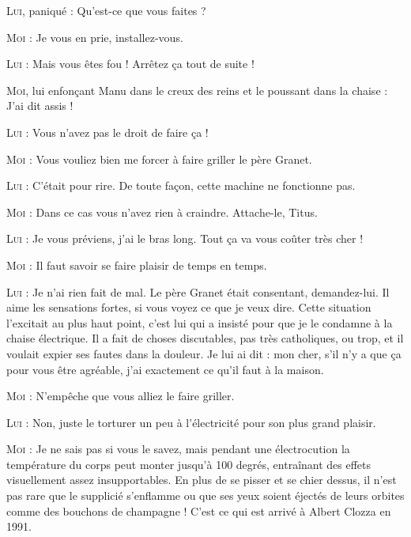 \begin{dialogue}

\textsc{Lui}, paniqué : Qu’est-ce que vous faites ?

\textsc{Moi} : Je vous en prie, installez-vous.

\textsc{Lui} : Mais vous êtes fou ! Arrêtez ça tout de suite !

\textsc{Moi}, lui enfonçant Manu dans le creux des reins et le poussant dans la chaise : J’ai dit assis !

\textsc{Lui} : Vous n’avez pas le droit de faire ça !

\textsc{Moi} : Vous vouliez bien me forcer à faire griller le père Granet.

\textsc{Lui} : C’était pour rire. De toute façon, cette machine ne fonctionne pas.

\textsc{Moi} : Dans ce cas vous n’avez rien à craindre. Attache-le, Titus.

\textsc{Lui} : Je vous préviens, j’ai le bras long. Tout ça va vous coûter très cher !

\textsc{Moi} : Il faut savoir se faire plaisir de temps en temps.

\textsc{Lui} : Je n’ai rien fait de mal. Le père Granet était consentant, demandez-lui. Il aime les sensations fortes, si vous voyez ce que je veux dire. Cette situation l’excitait au plus haut point, c’est lui qui a insisté pour que je le condamne à la chaise électrique. Il a fait de choses discutables, pas très catholiques, ou trop, et il voulait expier ses fautes dans la douleur. Je lui ai dit : mon cher, s’il n’y a que ça pour vous être agréable, j’ai exactement ce qu’il faut à la maison.

\textsc{Moi} : N’empêche que vous alliez le faire griller.

\textsc{Lui} : Non, juste le torturer un peu à l’électricité pour son plus grand plaisir.

\textsc{Moi} : Je ne sais pas si vous le savez, mais pendant une électrocution la température du corps peut monter jusqu’à 100 degrés, entraînant des effets visuellement assez insupportables. En plus de se pisser et se chier dessus, il n’est pas rare que le supplicié s’enflamme ou que ses yeux soient éjectés de leurs orbites comme des bouchons de champagne ! C’est ce qui est arrivé à Albert Clozza en 1991.

\end{dialogue}

